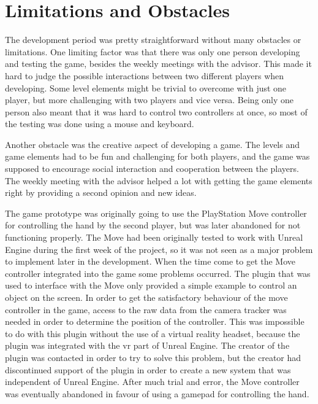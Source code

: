 \section{Limitations and Obstacles}
\label{sec:dev_limitations}
The development period was pretty straightforward without many obstacles or limitations. One limiting factor was that there was only one person developing and testing the game, besides the weekly meetings with the advisor. This made it hard to judge the possible interactions between two different players when developing. Some level elements might be trivial to overcome with just one player, but more challenging with two players and vice versa. Being only one person also meant that it was hard to control two controllers at once, so most of the testing was done using a mouse and keyboard.

Another obstacle was the creative aspect of developing a game. The levels and game elements had to be fun and challenging for both players, and the game was supposed to encourage social interaction and cooperation between the players. The weekly meeting with the advisor helped a lot with getting the game elements right by providing a second opinion and new ideas.

The game prototype was originally going to use the PlayStation Move controller for controlling the hand by the second player, but was later abandoned for not functioning properly. The Move had been originally tested to work with Unreal Engine during the first week of the project, so it was not seen as a major problem to implement later in the development. When the time come to get the Move controller integrated into the game some problems occurred. The plugin that was used to interface with the Move only provided a simple example to control an object on the screen. In order to get the satisfactory behaviour of the move controller in the game, access to the raw data from the camera tracker was needed in order to determine the position of the controller. This was impossible to do with this plugin without the use of a virtual reality headset, because the plugin was integrated with the \gls{vr} part of Unreal Engine. The creator of the plugin was contacted in order to try to solve this problem, but the creator had discontinued support of the plugin in order to create a new system that was independent of Unreal Engine. After much trial and error, the Move controller was eventually abandoned in favour of using a gamepad for controlling the hand.

